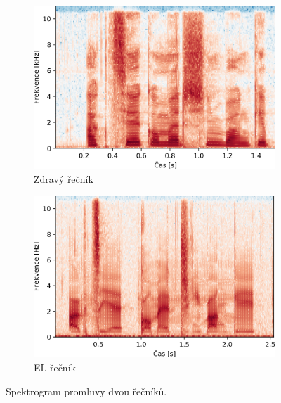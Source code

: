 \begin{figure}[htpb]
  \centering
  \begin{subfigure}[b]{0.4\textwidth}
    \includegraphics[width=\textwidth]{./ch4-experiments/img/spectrogram_normal.png}
    \caption{Zdravý řečník}
    \label{fig:experiments:analysis:spectrogram:normal}
  \end{subfigure}
  \begin{subfigure}[b]{0.4\textwidth}
    \includegraphics[width=\textwidth]{./ch4-experiments/img/spectrogram_el.png}
    \caption{EL řečník}
    \label{fig:experiments:analysis:spectrogram:el}
  \end{subfigure}
  \caption{Spektrogram promluvy  dvou řečníků.}
  \label{fig:experiments:analysis:spectrogram}
\end{figure}

